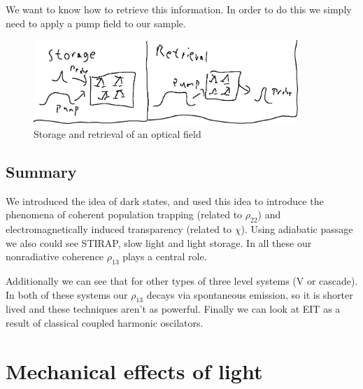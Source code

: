 We want to know how to retrieve this information. In order to do this we simply need to apply a pump field to our sample.
\begin{figure}[h!]
	\centering
	\includegraphics[width=10cm]{images/11-26-3.png}
	\caption*{Storage and retrieval of an optical field}
\end{figure}
\subsection{Summary}
We introduced the idea of dark states, and used this idea to introduce the phenomena of coherent population trapping (related to $\rho_{22}$) and electromagnetically induced transparency (related to $\chi$).
Using adiabatic passage we also could see STIRAP, slow light and light storage. In all these our nonradiative coherence $\rho_{13}$ plays a central role.

Additionally we can see that for other types of three level systems (V or cascade). In both of these systems our $\rho_{13}$ decays via spontaneous emission, so it is shorter lived and these techniques aren't as powerful.
Finally we can look at EIT as a result of classical coupled harmonic oscilators.
\section{Mechanical effects of light}
